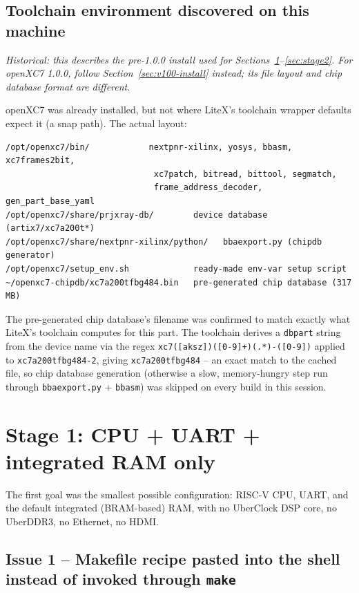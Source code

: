 \documentclass[11pt]{article}
\begin{document}
\subsection{Toolchain environment discovered on this machine}

\noindent\textit{Historical: this describes the pre-1.0.0 install used for
Sections~\ref{sec:stage1}--\ref{sec:stage2}. For openXC7 1.0.0, follow
Section~\ref{sec:v100-install} instead; its file layout and chip database
format are different.}

\smallskip\noindent
openXC7 was already installed, but not where LiteX's toolchain wrapper
defaults expect it (a snap path). The actual layout:

\begin{lstlisting}[style=termout]
/opt/openxc7/bin/            nextpnr-xilinx, yosys, bbasm, xc7frames2bit,
                              xc7patch, bitread, bittool, segmatch,
                              frame_address_decoder, gen_part_base_yaml
/opt/openxc7/share/prjxray-db/        device database (artix7/xc7a200t*)
/opt/openxc7/share/nextpnr-xilinx/python/   bbaexport.py (chipdb generator)
/opt/openxc7/setup_env.sh             ready-made env-var setup script
~/openxc7-chipdb/xc7a200tfbg484.bin   pre-generated chip database (317 MB)
\end{lstlisting}

The pre-generated chip database's filename was confirmed to match exactly
what LiteX's toolchain computes for this part. The toolchain derives a
\lstinline{dbpart} string from the device name via the regex
\lstinline{xc7([aksz])([0-9]+)(.*)-([0-9])} applied to
\lstinline{xc7a200tfbg484-2}, giving \lstinline{xc7a200tfbg484} --
an exact match to the cached file, so chip database generation (otherwise
a slow, memory-hungry step run through \lstinline{bbaexport.py} +
\lstinline{bbasm}) was skipped on every build in this session.

\section{Stage 1: CPU + UART + integrated RAM only}
\label{sec:stage1}

The first goal was the smallest possible configuration: RISC-V CPU, UART,
and the default integrated (BRAM-based) RAM, with no UberClock DSP core,
no UberDDR3, no Ethernet, no HDMI.

\subsection{Issue 1 -- Makefile recipe pasted into the shell instead of
invoked through \texttt{make}}
\end{document}
